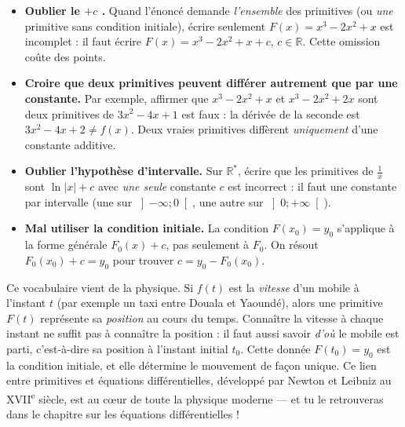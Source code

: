 \documentclass[11pt]{article}
\newcounter{popsec}
\newcounter{popsub}
\newcommand{\courssub}[1]{%
  \stepcounter{popsub}%
  \par\vspace{9pt}\noindent{\popxbold\fontsize{11.5}{13}\selectfont\color{popink}{\color{poporange}\thepopsec.\thepopsub}\hspace{6pt}#1}\par\nopagebreak\vspace{4pt}
}
\begin{document}
\courssub{Les pièges à éviter absolument}

\begin{attention}
\begin{itemize}
\item \textbf{Oublier le \og $+c$ \fg{}.} Quand l'énoncé demande \emph{l'ensemble} des primitives (ou \emph{une} primitive sans condition initiale), écrire seulement $F(x) = x^3 - 2x^2 + x$ est incomplet : il faut écrire $F(x) = x^3 - 2x^2 + x + c$, $c \in \mathbb{R}$. Cette omission coûte des points.
\item \textbf{Croire que deux primitives peuvent différer autrement que par une constante.} Par exemple, affirmer que $x^3 - 2x^2 + x$ et $x^3 - 2x^2 + 2x$ sont deux primitives de $3x^2 - 4x + 1$ est faux : la dérivée de la seconde est $3x^2 - 4x + 2 \neq f(x)$. Deux vraies primitives diffèrent \emph{uniquement} d'une constante additive.
\item \textbf{Oublier l'hypothèse d'intervalle.} Sur $\mathbb{R}^*$, écrire que les primitives de $\frac{1}{x}$ sont $\ln|x| + c$ avec \emph{une seule} constante $c$ est incorrect : il faut une constante par intervalle (une sur $\left]-\infty;0\right[$, une autre sur $\left]0;+\infty\right[$).
\item \textbf{Mal utiliser la condition initiale.} La condition $F(x_0) = y_0$ s'applique à la forme générale $F_0(x) + c$, pas seulement à $F_0$. On résout $F_0(x_0) + c = y_0$ pour trouver $c = y_0 - F_0(x_0)$.
\end{itemize}
\end{attention}

\begin{savaistu}
Ce vocabulaire vient de la physique. Si $f(t)$ est la \emph{vitesse} d'un mobile à l'instant $t$ (par exemple un taxi entre Douala et Yaoundé), alors une primitive $F(t)$ représente sa \emph{position} au cours du temps. Connaître la vitesse à chaque instant ne suffit pas à connaître la position : il faut aussi savoir \emph{d'où} le mobile est parti, c'est-à-dire sa position à l'instant initial $t_0$. Cette donnée $F(t_0) = y_0$ est la condition initiale, et elle détermine le mouvement de façon unique. Ce lien entre primitives et équations différentielles, développé par Newton et Leibniz au XVII\textsuperscript{e} siècle, est au cœur de toute la physique moderne — et tu le retrouveras dans le chapitre sur les équations différentielles !
\end{savaistu}
\end{document}
